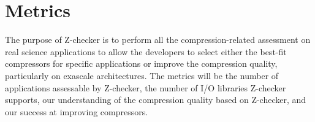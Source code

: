 \section{Metrics}

The purpose of Z-checker is to perform all the compression-related assessment on real science applications
to allow the developers to select either the best-fit compressors for specific applications or improve the compression quality, particularly on 
exascale architectures. The metrics will be the number of applications assessable by Z-checker, the number of I/O libraries Z-checker supports, our understanding of the compression quality based on Z-checker, and our success at improving compressors.

